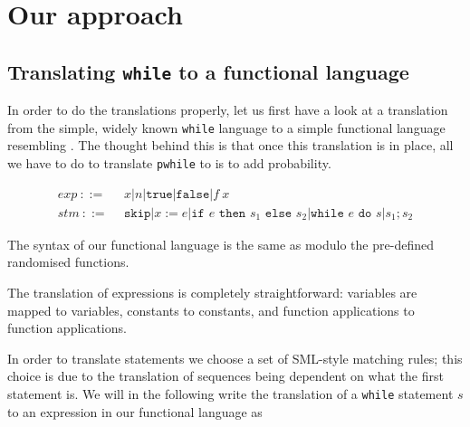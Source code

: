 \documentclass[11pt, leqno]{article}
\theoremstyle{definition}
\begin{document}



\section{Our approach}





\subsection{Translating \texttt{while} to a functional language}
In order to do the translations properly, let us first have a look at a translation
from the simple, widely known \texttt{while} language to a simple functional language
resembling \rml. The thought behind this is that once this translation is in place,
all we have to do to translate \texttt{pwhile} to \rml is to add probability.

\begin{align}
  \label{eq:while}
  exp~  ::=~~ & x \vert n \vert \texttt{true} \vert \texttt{false} \vert f~x \\
  stm~  ::=~~ & \texttt{skip} \vert x := e
               \vert \texttt{if } e \texttt{ then } s_1 \texttt{ else } s_2
               \vert \texttt{while } e \texttt{ do } s \vert s_1;s_2
\end{align}

The syntax of our functional language is the same as \rml modulo the pre-defined
randomised functions.

The translation of expressions is completely straightforward: variables are mapped to
variables, constants to constants, and function applications to function applications. 

In order to translate statements we choose a set of SML-style matching rules; this
choice is due to the translation of sequences being dependent on what the first
statement is. We will in the following write the translation of a \texttt{while}
statement $s$ to an expression in our functional language as 
\end{document}
